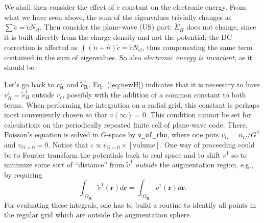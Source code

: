 \documentclass[a4paper,twocolumn,12pt]{article}
\newcommand{\var}[1]{{\tt #1}}
\begin{document}
{We shall then consider the effect of $\tilde{c}$ constant on the
electronic energy.  From what we have seen above, the sum of the
eigenvalues trivially changes as
$\sum{\tilde{c}}=\tilde{c}N_{el}$.
%
Then consider the plane-wave (US) part: $\tilde{E}_H$ does not change,
since it is built directly from the charge density and not the
potential; the DC correction is affected as
$\int{(\tilde{n}+\hat{n})\tilde{c}}=\tilde{c}N_{el}$, thus
compensating the same term contained in the sum of eigenvalues.
%
%
So also {\em electronic energy is invariant}, as it should be.

Let's go back to $c^1_{\mathbf{R}}$ and $\tilde{c}^1_{\mathbf{R}}$.
Eq.~(\ref{eq:newH}) indicates that it is necessary to have
$v^1_{H}=\tilde{v}^1_{H}$ outside $r_c$, possibly with the addition of
a common constant to both terms.  When performing the integration on a
radial grid, this constant is perhaps most conveniently chosen so that
$v(\infty)=0$.  This condition cannot be set for calculations on the
periodically repeated finite cell of plane-wave code.  There,
Poisson's equation is solved in $G$-space by \var{v\_of\_rho}, where
one puts $v_G=n_G/G^2$ and $v_{G=0}=0$.  Notice that
$c\propto{}v_{G=0}\times[{\textrm{volume}}]$.  One way of proceeding
could be to Fourier transform the potentials back to real space and to
shift $v^1$ so to minimize some sort of ``distance'' from
$\tilde{v}^1$ {\em outside} the augmentation region, e.g., by
requiring
\begin{equation}
\int_{^c\Omega_{\mathbf{R}}}\tilde{v}^1({\mathbf{r}})d{\mathbf{r}}=\int_{^c\Omega_{\mathbf{R}}}{v}^1({\mathbf{r}})d{\mathbf{r}}.
\end{equation}
For evaluating these integrals, one has to build a routine to identify
all points in the regular grid which are outside the augmentation
sphere.


}
\end{document}
